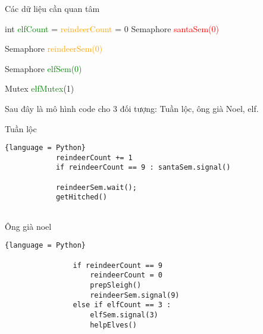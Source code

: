 \documentclass[a4paper]{article}
\begin{document}
     \begin{center}
        Các dữ liệu cần quan tâm
        \begin{tcolorbox}
        int \textcolor{green}{elfCount} = \textcolor{orange}{reindeerCount} = 0
        \newline
        \newline
        Semaphore \textcolor{red}{santaSem(0)}
        
        Semaphore \textcolor{orange}{reindeerSem(0)}
        
        Semaphore \textcolor{green}{elfSem(0)}
        
        \vspace{5mm}
        
        Mutex \textcolor{green}{elfMutex}(1)
        
        \end{tcolorbox}
    \end{center}
    
    Sau đây là mô hình code cho 3 đối tượng: Tuần lộc, ông già Noel, elf.
    
     \begin{center}
        Tuần lộc
        \begin{tcolorbox}
            \begin{lstlisting}{language = Python}
            reindeerCount += 1
            if reindeerCount == 9 : santaSem.signal()
 
            reindeerSem.wait();
            getHitched()
            
            \end{lstlisting}
        \end{tcolorbox}
    \end{center}
    
    
    \begin{center}
        Ông già noel
        \begin{tcolorbox}
            \begin{lstlisting}{language = Python}

                if reindeerCount == 9 
                    reindeerCount = 0
                    prepSleigh()
                    reindeerSem.signal(9)
                else if elfCount == 3 :
                    elfSem.signal(3)
                    helpElves()

            \end{lstlisting}
        \end{tcolorbox}
    \end{center}
    
\end{document}
